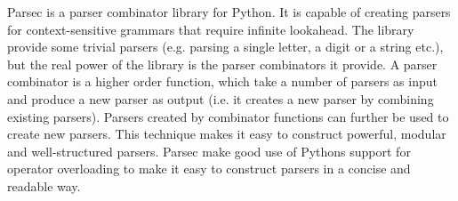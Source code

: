 Parsec is a parser combinator library for Python. It is capable of creating parsers for context-sensitive grammars that require infinite lookahead. The library provide some trivial parsers (e.g. parsing a single letter, a digit or a string etc.), but the real power of the library is the parser combinators it provide. A parser combinator is a higher order function, which take a number of parsers as input and produce a new parser as output (i.e. it creates a new parser by combining existing parsers). Parsers created by combinator functions can further be used to create new parsers. This technique makes it easy to construct powerful, modular and well-structured parsers. Parsec make good use of Pythons support for operator overloading to make it easy to construct parsers in a concise and readable way.



